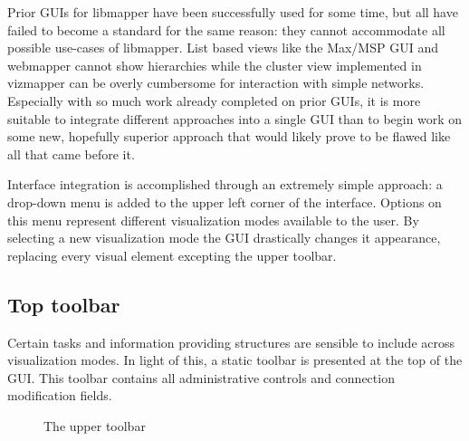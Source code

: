 Prior GUIs for libmapper have been successfully used for some time, but all have failed to become a standard for the same reason: they cannot accommodate all possible use-cases of libmapper. List based views like the Max/MSP GUI and webmapper cannot show hierarchies while the cluster view implemented in vizmapper can be overly cumbersome for interaction with simple networks. Especially with so much work already completed on prior GUIs, it is more suitable to integrate different approaches into a single GUI than to begin work on some new, hopefully superior approach that would likely prove to be flawed like all that came before it. 

Interface integration is accomplished through an extremely simple approach: a drop-down menu is added to the upper left corner of the interface. Options on this menu represent different visualization modes available to the user. By selecting a new visualization mode the GUI drastically changes it appearance, replacing every visual element excepting the upper toolbar.

\subsection{Top toolbar}

Certain tasks and information providing structures are sensible to include across visualization modes. In light of this, a static toolbar is presented at the top of the GUI. This toolbar contains all administrative controls and connection modification fields. 

\begin{figure}[ht]
\centering
\caption{The upper toolbar}
\label{fig:toolbar}
\end{figure}

